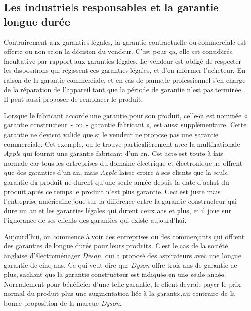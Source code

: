 \subsection{Les industriels responsables et la garantie longue durée}


\smallbreak
Contrairement aux garanties légales, la garantie contractuelle ou commerciale est offerte ou non selon la décision du vendeur. C'est pour ça, elle est considérée facultative par rapport aux garanties légales. Le vendeur est obligé de respecter les dispositions qui régissent ces garanties légales, et d'en informer l'acheteur. 
En raison de la garantie commerciale, et en cas de panne,le professionnel s’en charge de la réparation de l’appareil tant que la période de garantie n'est pas terminée. Il peut aussi proposer de remplacer le produit.


\smallbreak
Lorsque le fabricant accorde une garantie pour son produit, celle-ci est nommée « garantie constructeur » ou « garantie fabricant », est aussi supplémentaire. Cette garantie ne devient valide que si le vendeur ne propose pas une garantie commerciale.
\smallbreak
Cet exemple, on le trouve particulièrement avec la multinationale \textit{Apple} qui fournit une garantie fabricant d’un an. Cet acte est toute à fais normale car tous les entreprises du domaine électrique et électronique ne offrent que des garanties d’un an, mais \textit{Apple} laisse croire à ses clients que la seule garantie du produit ne durent qu'une seule année depuis la date d'achat du produit,après ce temps le produit n'est plus garantie. Ceci est juste mais l'entreprise américaine joue sur la différence entre la garantie constructeur qui dure un an et les garanties légales qui durent deux ans et plus, et il joue sur l'ignorance de ses clients des garanties qui existe aujourd'hui.


\smallbreak
Aujourd'hui, on commence à voir des entreprises ou des commerçants qui offrent des garanties de longue durée pour leurs produits.
\smallbreak C'est le cas de la société anglaise d’électroménager \textit{Dyson}, qui a proposé des aspirateurs avec une longue garantie de cinq ans. Ce qui veut dire que \textit{Dyson} offre trois ans de garantie de plus, sachant que la garantie constructeur est indiquée en une seule année. Normalement pour bénéficier d'une telle garantie, le client devrait payer le prix normal du produit plus une augmentation liée à la garantie,au contraire de la bonne proposition de la marque \textit{Dyson}.


